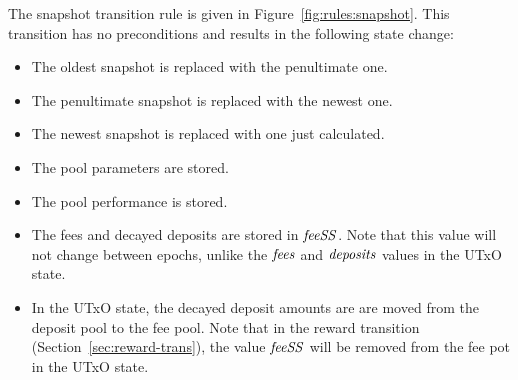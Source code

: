 The snapshot transition rule is given in Figure~\ref{fig:rules:snapshot}.
This transition has no preconditions and results in the following state change:

\begin{itemize}
  \item The oldest snapshot is replaced with the penultimate one.
  \item The penultimate snapshot is replaced with the newest one.
  \item The newest snapshot is replaced with one just calculated.
  \item The pool parameters are stored.
  \item The pool performance is stored.
  \item The fees and decayed deposits are stored in $\mathit{feeSS}$. Note that this value will not
    change between epochs, unlike the $\mathit{fees}$ and $\mathit{deposits}$ values in the UTxO state.
  \item In the UTxO state, the decayed deposit amounts are are moved from the deposit pool
    to the fee pool. Note that in the reward transition (Section~\ref{sec:reward-trans}),
    the value $\mathit{feeSS}$ will be removed from the fee pot in the UTxO state.
\end{itemize}

